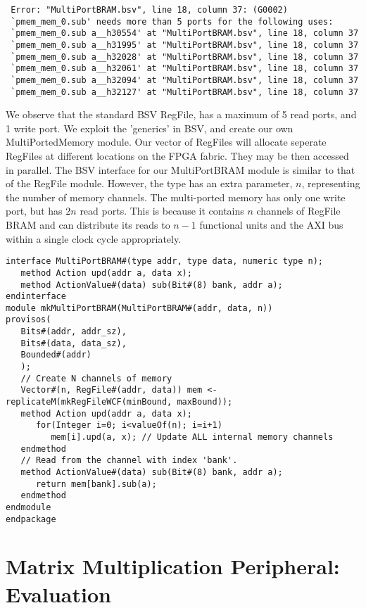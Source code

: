 \documentclass[a4paper,8pt]{report}
\begin{document}
\scriptsize
\begin{verbatim}
 Error: "MultiPortBRAM.bsv", line 18, column 37: (G0002)
 `pmem_mem_0.sub' needs more than 5 ports for the following uses:
 `pmem_mem_0.sub a__h30554' at "MultiPortBRAM.bsv", line 18, column 37
 `pmem_mem_0.sub a__h31995' at "MultiPortBRAM.bsv", line 18, column 37
 `pmem_mem_0.sub a__h32028' at "MultiPortBRAM.bsv", line 18, column 37
 `pmem_mem_0.sub a__h32061' at "MultiPortBRAM.bsv", line 18, column 37
 `pmem_mem_0.sub a__h32094' at "MultiPortBRAM.bsv", line 18, column 37
 `pmem_mem_0.sub a__h32127' at "MultiPortBRAM.bsv", line 18, column 37
\end{verbatim}
\normalsize
We observe that the standard BSV RegFile, has a maximum of 5 read ports, and 1
write port. We exploit the 'generics' in BSV, and create our own
MultiPortedMemory module. Our vector of RegFiles will allocate seperate RegFiles
at different locations on the FPGA fabric. They may be then accessed in
parallel.
The BSV interface for our MultiPortBRAM module is similar to that of the RegFile
module. However, the type has an extra parameter, $n$, representing the number of memory
channels. The multi-ported memory has only one write port, but has $2n$ read
ports. This is because it contains $n$ channels of RegFile BRAM and can
distribute its reads to $n-1$ functional units and the AXI bus within a single
clock cycle appropriately.


\scriptsize
\begin{verbatim}
interface MultiPortBRAM#(type addr, type data, numeric type n);
   method Action upd(addr a, data x);
   method ActionValue#(data) sub(Bit#(8) bank, addr a);
endinterface
module mkMultiPortBRAM(MultiPortBRAM#(addr, data, n))
provisos(
   Bits#(addr, addr_sz),
   Bits#(data, data_sz),
   Bounded#(addr)
   );
   // Create N channels of memory
   Vector#(n, RegFile#(addr, data)) mem <- replicateM(mkRegFileWCF(minBound, maxBound));
   method Action upd(addr a, data x);
      for(Integer i=0; i<valueOf(n); i=i+1)
         mem[i].upd(a, x); // Update ALL internal memory channels
   endmethod
   // Read from the channel with index 'bank'.
   method ActionValue#(data) sub(Bit#(8) bank, addr a);
      return mem[bank].sub(a);
   endmethod
endmodule
endpackage
\end{verbatim}
\normalsize





\chapter{Matrix Multiplication Peripheral: Evaluation}
\end{document}
